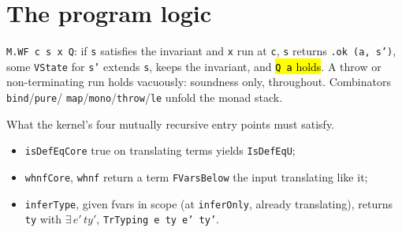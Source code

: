 \section{The program logic}

\begin{definition}
  \label{def:vtc-m-wf}
  \leanok

   \texttt{M.WF c s x Q}: if \texttt{s} satisfies the invariant and \texttt{x} run
  at \texttt{c}, \texttt{s} returns \texttt{.ok (a, s')}, some \texttt{VState} for \texttt{s'}
  extends \texttt{s}, keeps the invariant, and \hl{\texttt{Q a} holds}. A throw or non-terminating
  run holds vacuously: soundness only, throughout. Combinators \texttt{bind}/\texttt{pure}/
  \texttt{map}/\texttt{mono}/\texttt{throw}/\texttt{le} unfold the monad stack.
\end{definition}

\begin{definition}
  \label{def:vtc-methods-wf}
  \leanok

   What the kernel's four mutually recursive entry points must satisfy.
  \begin{itemize}
  \item \texttt{isDefEqCore} true on translating terms yields \texttt{IsDefEqU};
  \item \texttt{whnfCore}, \texttt{whnf} return a term \texttt{FVarsBelow} the input translating
    like it;
  \item \texttt{inferType}, given fvars in scope (at \texttt{inferOnly}, already translating),
    returns \texttt{ty} with $\exists\, e'\, ty'$, \texttt{TrTyping e ty e' ty'}.
  \end{itemize}
\end{definition}

